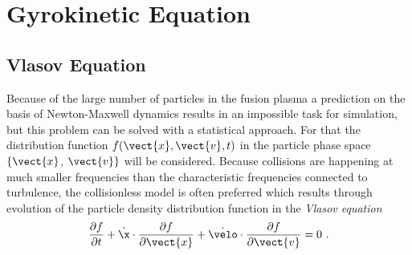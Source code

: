 \newpage
\section{Gyrokinetic Equation}
\label{sec:gyrokinetic}

\subsection{Vlasov Equation}
\label{sub:vlasov}

Because of the large number of particles in the fusion plasma a prediction on the basis of Newton-Maxwell dynamics results in an impossible task for simulation, but this problem can be solved with a statistical approach. For that the distribution function $f(\vect{x}, \vect{v}, t)$ in the particle phase space $\{\vect{x}$, $\vect{v}\}$ will be considered. Because collisions are happening at much smaller frequencies than the characteristic frequencies connected to turbulence, the collisionless model is often preferred \cite{Garbet2010} which results through evolution of the particle density distribution function in the \textit{Vlasov equation}
\begin{gather}
	\frac{\partial f}{\partial t} + \dot{\x} \cdot \frac{\partial f}{\partial \vect{x}}  + \dot{\velo} \cdot \frac{\partial f}{\partial \vect{v}} = 0~.
	\label{eq:vlasov}
\end{gather}

